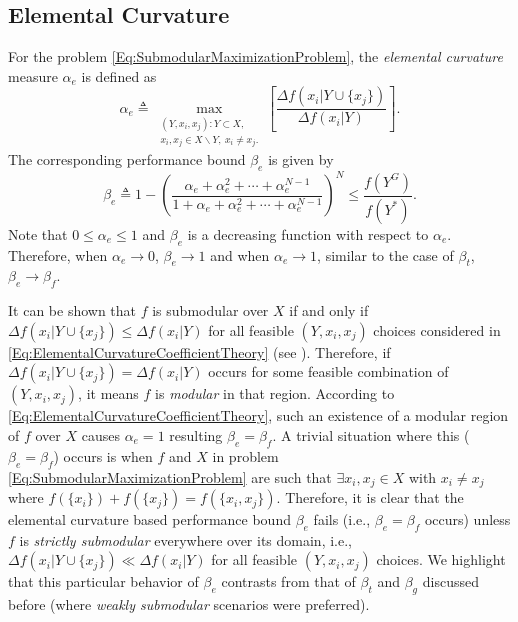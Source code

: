 \documentclass[letterpaper, 10 pt, conference]{ieeeconf}
\begin{document}
{%

\subsection{Elemental Curvature \cite{Wang2016}}\label{SubSec:ElementalCurvature}

For the problem \eqref{Eq:SubmodularMaximizationProblem}, the \emph{elemental curvature} measure $\alpha_e$ is defined as 
\begin{equation}\label{Eq:ElementalCurvatureCoefficientTheory}
    \alpha_e \triangleq \max_{\substack{(Y,x_i,x_j): Y \subset X,\\ x_i,x_j \in X \backslash Y,\ x_i \neq x_j.}}\left[\frac{\Delta f(x_i \vert Y \cup \{x_j\})}{\Delta f(x_i \vert Y)}\right].
\end{equation}
The corresponding performance bound $\beta_e$ is given by 
\begin{equation}\label{Eq:ElementalCurvatureBoundTheory}
    \beta_e \triangleq 1-\left(\frac{\alpha_e + \alpha_e^2 + \cdots + \alpha_e^{N-1}}{1 + \alpha_e + \alpha_e^2 + \cdots + \alpha_e^{N-1}}\right)^N \leq \frac{f(Y^G)}{f(Y^*)}.
\end{equation}
Note that $0 \leq \alpha_e \leq 1$ and $\beta_e$ is a decreasing function with respect to $\alpha_e$. Therefore, when $\alpha_e \rightarrow 0$, $\beta_e \rightarrow 1$ and when $\alpha_e \rightarrow 1$, similar to the case of $\beta_t$, $\beta_e \rightarrow \beta_f$.



It can be shown that $f$ is submodular over $X$ if and only if $\Delta f(x_i \vert Y \cup  \{x_j\}) \leq \Delta f(x_i \vert Y)$ for all feasible $(Y,x_i,x_j)$ choices considered in \eqref{Eq:ElementalCurvatureCoefficientTheory} (see \cite[Prop. 2.1]{Nemhauser1978}). 
Therefore, if $\Delta f(x_i \vert Y \cup  \{x_j\}) = \Delta f(x_i \vert Y)$ occurs for some feasible combination of $(Y,x_i,x_j)$, it means $f$ is \emph{modular} in that region. According to \eqref{Eq:ElementalCurvatureCoefficientTheory}, such an existence of a modular region of $f$ over $X$ causes $\alpha_e = 1$ resulting $\beta_e = \beta_f$. A trivial situation where this ($\beta_e = \beta_f$) occurs is when $f$ and $X$ in problem \eqref{Eq:SubmodularMaximizationProblem} are such that $\exists x_i,x_j \in X$ with $x_i \neq x_j$ where $f(\{x_i\}) + f(\{x_j\}) = f(\{x_i,x_j\})$. Therefore, it is clear that the elemental curvature based performance bound $\beta_e$ fails (i.e., $\beta_e = \beta_f$ occurs) unless $f$ is \emph{strictly submodular} everywhere over its domain, i.e., $\Delta f(x_i \vert Y \cup  \{x_j\}) \ll \Delta f(x_i \vert Y)$ for all feasible $(Y,x_i,x_j)$ choices. We highlight that this particular behavior of $\beta_e$ contrasts from that of $\beta_t$ and $\beta_g$ discussed before (where \emph{weakly submodular} scenarios were preferred). 

}
\end{document}
